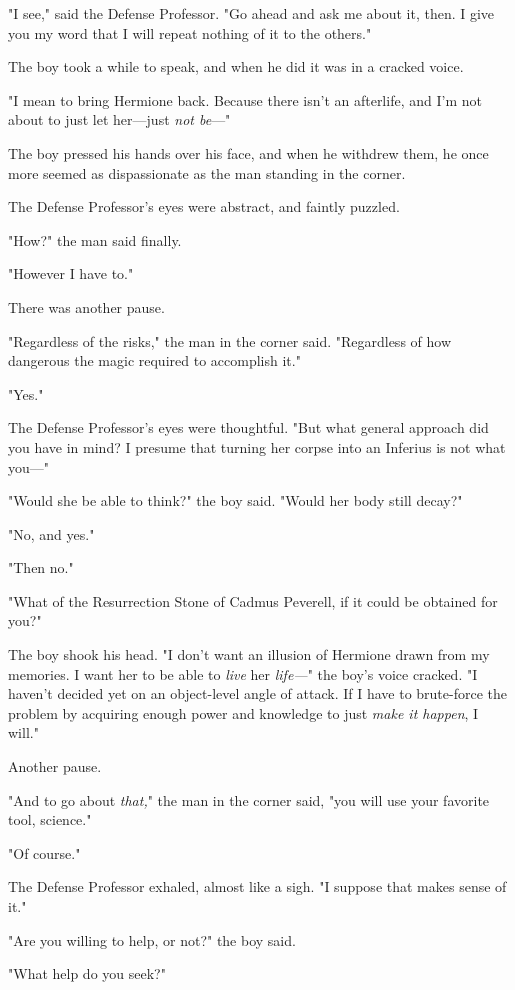 "I see," said the Defense Professor. "Go ahead and ask me about it, then. I 
give you my word that I will repeat nothing of it to the others."

The boy took a while to speak, and when he did it was in a cracked voice.

"I mean to bring Hermione back. Because there isn't an afterlife, and I'm not 
about to just let her---just \emph{not be}---"

The boy pressed his hands over his face, and when he withdrew them, he once 
more seemed as dispassionate as the man standing in the corner.

The Defense Professor's eyes were abstract, and faintly puzzled.

"How?" the man said finally.

"However I have to."

There was another pause.

"Regardless of the risks," the man in the corner said. "Regardless of how 
dangerous the magic required to accomplish it."

"Yes."

The Defense Professor's eyes were thoughtful. "But what general approach did 
you have in mind? I presume that turning her corpse into an Inferius is not 
what you---"

"Would she be able to think?" the boy said. "Would her body still decay?"

"No, and yes."

"Then no."

"What of the Resurrection Stone of Cadmus Peverell, if it could be obtained for 
you?"

The boy shook his head. "I don't want an illusion of Hermione drawn from my 
memories. I want her to be able to \emph{live} her \emph{life---}" the boy's 
voice cracked. "I haven't decided yet on an object-level angle of attack. If I 
have to brute-force the problem by acquiring enough power and knowledge to just 
\emph{make it happen}, I will."

Another pause.

"And to go about \emph{that,}" the man in the corner said, "you will use your 
favorite tool, science."

"Of course."

The Defense Professor exhaled, almost like a sigh. "I suppose that makes sense 
of it."

"Are you willing to help, or not?" the boy said.

"What help do you seek?"

